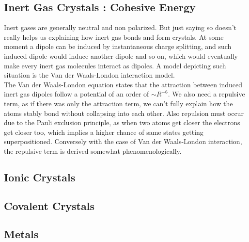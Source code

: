 \documentclass[paper=a4, fontsize=11pt]{scrartcl}
\begin{document}
\vspace{0.15in}
\subsection{Inert Gas Crystals : Cohesive Energy}
\vspace{0.15in}

Inert gases are generally neutral and non polarized. But just saying so doesn't really helps us explaining how inert gas bonds and form crystals. At some moment a dipole can be induced by instantaneous charge splitting, and such induced dipole would induce another dipole and so on, which would eventually make every inert gas molecules interact as dipoles. A model depicting such situation is the Van der Waals-London interaction model. \\

The Van der Waals-London equation states that the attraction between induced inert gas dipoles follow a potential of an order of $\sim R^{-6}$. We also need a repulsive term, as if there was only the attraction term, we can't fully explain how the atoms stably bond without collapsing into each other. Also repulsion must occur due to the Pauli exclusion principle, as when two atoms get closer the electrons get closer too, which implies a higher chance of same states getting superpositioned. Conversely with the case of Van der Waals-London interaction, the repulsive term is derived somewhat phenomenologically. 

\vspace{0.15in}
\subsection{Ionic Crystals}
\vspace{0.15in}

\vspace{0.15in}
\subsection{Covalent Crystals}
\vspace{0.15in}

\vspace{0.15in}
\subsection{Metals}
\vspace{0.15in}
\end{document}
